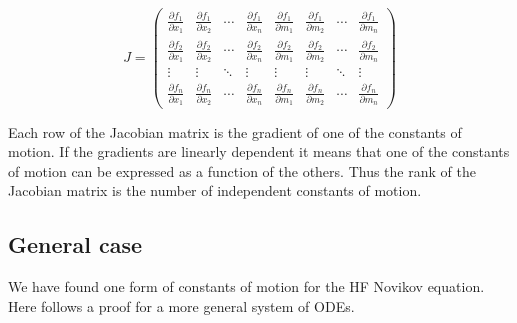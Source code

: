 \documentclass[english,master]{liumaiex}
\theoremstyle{plain}
\theoremstyle{definition}
\begin{document}
\begin{equation}
	J = 
	\begin{pmatrix}
		\frac{\partial f_1}{\partial x_1} & \frac{\partial f_1}{\partial x_2} & \cdots & \frac{\partial f_1}{\partial x_n} & \frac{\partial f_1}{\partial m_1} & \frac{\partial f_1}{\partial m_2} & \cdots & \frac{\partial f_1}{\partial m_n} \\
		\frac{\partial f_2}{\partial x_1} & \frac{\partial f_2}{\partial x_2} & \cdots & \frac{\partial f_2}{\partial x_n} & \frac{\partial f_2}{\partial m_1} & \frac{\partial f_2}{\partial m_2} & \cdots & \frac{\partial f_2}{\partial m_n} \\
		\vdots & \vdots & \ddots & \vdots & \vdots & \vdots & \ddots & \vdots \\
		\frac{\partial f_n}{\partial x_1} & \frac{\partial f_n}{\partial x_2} & \cdots & \frac{\partial f_n}{\partial x_n} & \frac{\partial f_n}{\partial m_1} & \frac{\partial f_n}{\partial m_2} & \cdots & \frac{\partial f_n}{\partial m_n}
	\end{pmatrix}
\end{equation}

Each row of the Jacobian matrix is the gradient of one of the constants of motion. If the gradients are linearly dependent it means that one of the constants of motion can be expressed as a function of the others. Thus the rank of the Jacobian matrix is the number of independent constants of motion.

\subsection*{General case}

We have found one form of constants of motion for the HF Novikov equation. Here follows a proof for a more general system of ODEs.
\end{document}
